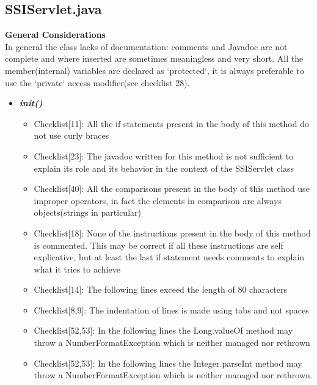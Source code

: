\documentclass[11pt,titlepage]{article} %
\begin{document}
\subsection{SSIServlet.java}
  \textbf{General Considerations} \hfill \\
  In general the class lacks of documentation: comments and Javadoc are not complete and where inserted are sometimes meaningless and very short.\newline
  All the member(internal) variables are declared as `protected`, it is always preferable to use the `private` access modifier(see checklist 28).
  \begin{itemize}
   \item \textbf{\textit{init()}}
   \begin{itemize}
    \item Checklist[11]: All the if statements present in the body of this method do not use curly braces
    \item Checklist[23]: The javadoc written for this method is not sufficient to explain its role and its behavior in the context of the SSIServlet class
    \item Checklist[40]: All the comparisons present in the body of this method use improper operators, in fact the elements in comparison are always objects(strings in particular)
    \item Checklist[18]: None of the instructions present in the body of this method is commented. This may be correct if all these instructions are self explicative, but at least the last if statement needs comments to explain what it tries to achieve
    \item Checklist[14]: The following lines exceed the length of 80 characters
      
      
      
      
      
    \item Checklist[8,9]: The indentation of lines is made using tabs and not spaces
    \item Checklist[52,53]: In the following lines  the Long.valueOf method may throw a NumberFormatException which is neither managed nor rethrown
      
    \item Checklist[52,53]: In the following lines the Integer.parseInt method may throw a NumberFormatException which is neither managed nor rethrown.
      
   \end{itemize}



\end{itemize}
\end{document}

